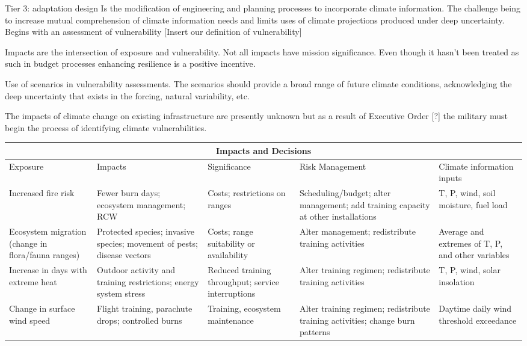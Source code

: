 \documentclass[10pt]{amsart}
\begin{document}
Tier 3: adaptation design
Is the modification of engineering and planning processes to incorporate climate information.
The challenge being to increase mutual comprehension of climate information needs and limits uses of climate projections produced under 
deep uncertainty.
Begins with an assessment of vulnerability 
[Insert our definition of vulnerability]

Impacts are the intersection of exposure and vulnerability.
Not all impacts have mission significance. 
Even though it hasn't been treated as such in budget processes enhancing resilience is a positive incentive.

Use of scenarios in vulnerability assessments.
The scenarios should provide a broad range of future climate conditions, acknowledging the deep uncertainty that exists in the forcing, natural variability, etc. 


The impacts of climate change on existing infrastructure are presently unknown but as a result of Executive Order [?] the military must begin the process of identifying climate vulnerabilities. 

\begin{tabular}{ |p{2.5cm}|p{2.5cm}|p{2.5cm}|p{2.5cm}|p{2.5cm}| }
\hline
\multicolumn{5}{|c|}{Impacts and Decisions} \\
\hline
Exposure & Impacts & Significance & Risk Management & Climate information inputs \\
\hline
Increased fire risk & Fewer burn days; ecosystem management; RCW & Costs; restrictions on ranges & Scheduling/budget; alter management; add training capacity at other installations & T, P, wind, soil moisture, fuel load \\
\hline
Ecosystem migration (change in flora/fauna ranges) & Protected species; invasive species; movement of pests; disease vectors & Costs; range suitability or availability & Alter management; redistribute training activities & Average and extremes of T, P, and other variables \\
\hline
Increase in days with extreme heat & Outdoor activity and training restrictions; energy system stress & Reduced training throughput; service interruptions & Alter training regimen; redistribute training activities & T, P, wind, solar insolation \\
\hline
Change in surface wind speed & Flight training, parachute drops; controlled burns & Training, ecosystem maintenance & Alter training regimen; redistribute training activities; change burn patterns & Daytime daily wind threshold exceedance \\
\hline
\end{tabular}
\end{document}
